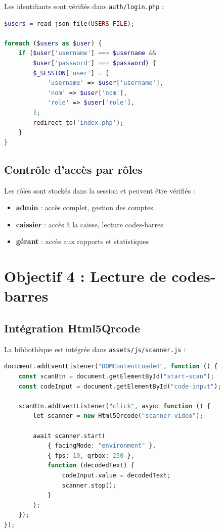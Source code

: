 \documentclass[12pt,a4paper,french]{report}
\begin{document}
Les identifiants sont vérifiés dans \texttt{auth/login.php} :

\begin{lstlisting}[language=PHP, caption=Authentification (extrait)]
$users = read_json_file(USERS_FILE);

foreach ($users as $user) {
    if ($user['username'] === $username && 
        $user['password'] === $password) {
        $_SESSION['user'] = [
            'username' => $user['username'],
            'nom' => $user['nom'],
            'role' => $user['role'],
        ];
        redirect_to('index.php');
    }
}
\end{lstlisting}

\subsection{Contrôle d'accès par rôles}

Les rôles sont stockés dans la session et peuvent être vérifiés :

\begin{itemize}
    \item \textbf{admin} : accès complet, gestion des comptes
    \item \textbf{caissier} : accès à la caisse, lecture codes-barres
    \item \textbf{gérant} : accès aux rapports et statistiques
\end{itemize}

\section{Objectif 4 : Lecture de codes-barres}

\subsection{Intégration Html5Qrcode}

La bibliothèque est intégrée dans \texttt{assets/js/scanner.js} :

\begin{lstlisting}[language=PHP, caption=Scanner de codes-barres]
document.addEventListener("DOMContentLoaded", function () {
    const scanBtn = document.getElementById("start-scan");
    const codeInput = document.getElementById("code-input");

    scanBtn.addEventListener("click", async function () {
        let scanner = new Html5Qrcode("scanner-video");
        
        await scanner.start(
            { facingMode: "environment" },
            { fps: 10, qrbox: 250 },
            function (decodedText) {
                codeInput.value = decodedText;
                scanner.stop();
            }
        );
    });
});
\end{lstlisting}
\end{document}
